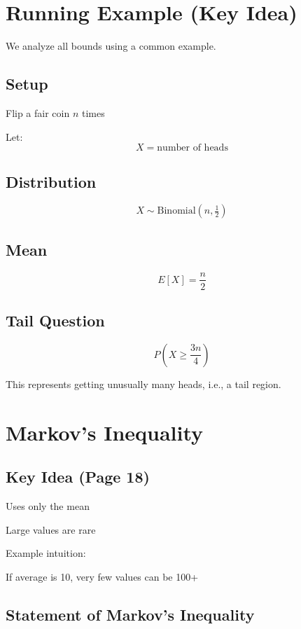 \documentclass[11pt]{article}
\begin{document}
\section{Running Example (Key Idea)}

We analyze all bounds using a common example.

\subsection{Setup}

Flip a fair coin $n$ times

Let:
\[
X = \text{number of heads}
\]

\subsection{Distribution}

\[
X \sim \text{Binomial}(n, \tfrac{1}{2})
\]

\subsection{Mean}

\[
E[X] = \frac{n}{2}
\]

\subsection{Tail Question}

\[
P\left(X \geq \frac{3n}{4}\right)
\]

This represents getting unusually many heads, i.e., a tail region.

\section{Markov’s Inequality}

\subsection{Key Idea (Page 18)}

Uses only the mean

Large values are rare

Example intuition:

If average is 10, very few values can be 100+

\subsection{Statement of Markov’s Inequality}
\end{document}
